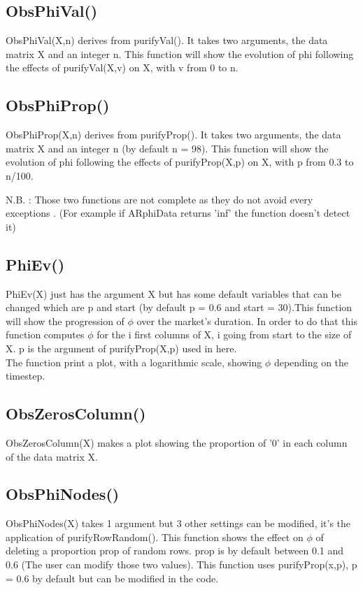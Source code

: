 \documentclass{report}
\begin{document}
\subsection{ObsPhiVal()}

ObsPhiVal(X,n) derives from purifyVal(). It takes two arguments, the data matrix X and an integer n. This function will show the evolution of phi following the effects of purifyVal(X,v) on X, with v from 0 to n. 

\subsection{ObsPhiProp()}

ObsPhiProp(X,n) derives from purifyProp(). It takes two arguments, the data matrix X and an integer n (by default n = 98). This function will show the evolution of phi following the effects of purifyProp(X,p) on X, with p from 0.3 to n/100. 

N.B. : Those two functions are not complete as they do not avoid every exceptions . (For example if ARphiData returns 'inf' the function doesn't detect  it)

\subsection{PhiEv()}

PhiEv(X) just has the argument X but has some default variables that can be changed which are p and start (by default p = 0.6 and start = 30).This function will show the progression of $\phi $ over the market's duration. In order to do that this function computes $\phi $ for the i first columns of X, i going from start to the size of X. p is the argument of purifyProp(X,p) used in here. \\
The function print a plot, with a logarithmic scale, showing $\phi $ depending on the timestep.

\subsection{ObsZerosColumn()}

ObsZerosColumn(X) makes a plot showing the proportion of '0' in each column of the data matrix X.

\subsection{ObsPhiNodes()}

ObsPhiNodes(X) takes 1 argument but 3 other settings can be modified, it's the application of purifyRowRandom(). This function shows the effect on $\phi $ of deleting a proportion prop of random rows. prop is by default between 0.1 and 0.6 (The user can modify those two values). This function uses purifyProp(x,p), p = 0.6 by default but can be modified in the code. 
\end{document}
